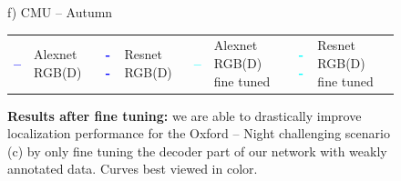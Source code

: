 \begin{figure}
\begin{minipage}{0.16\linewidth}
		f) CMU -- Autumn
	\end{minipage}
	
	\vspace{0.2cm}
		
	\begin{scriptsize}
	\begin{tabular}{c l c l	c l c l	}
		\textcolor{blue}{\textbf{--}} & Alexnet RGB(D) & 
		\textcolor{blue}{\textbf{- -}} & Resnet RGB(D) &
		\textcolor{cyan}{\textbf{--}} & Alexnet RGB(D) fine tuned &
		\textcolor{cyan}{\textbf{- -}} & Resnet RGB(D) fine tuned \\
	\end{tabular}		
	\end{scriptsize}
	
	\caption[Results after fine tuning]{\label{fig:ft_night} \textbf{Results after fine tuning:} we are able to drastically improve localization performance for the Oxford -- Night challenging scenario (c) by only fine tuning the decoder part of our network with weakly annotated data. Curves best viewed in color.}
\end{figure}
